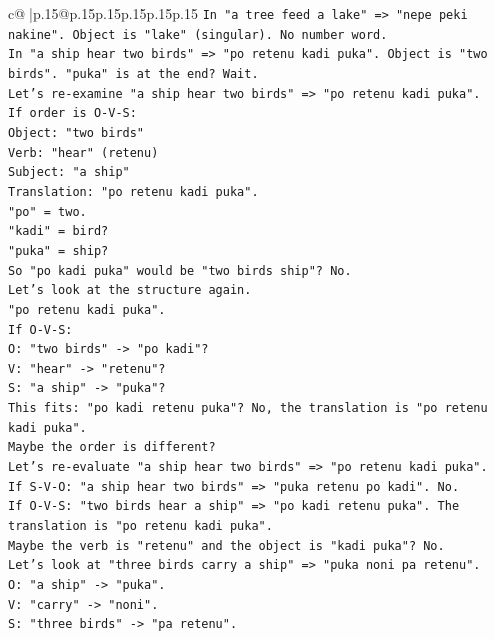 \documentclass{article}
\begin{document}
{\begin{supertabular}{c@{$\;$}|p{.15\linewidth}@{}p{.15\linewidth}p{.15\linewidth}p{.15\linewidth}p{.15\linewidth}p{.15\linewidth}}
{{{\texttt{In "a tree feed a lake" => "nepe peki nakine". Object is "lake" (singular). No number word.} \\
\texttt{In "a ship hear two birds" => "po retenu kadi puka". Object is "two birds". "puka" is at the end? Wait.} \\
\texttt{Let's re{-}examine "a ship hear two birds" => "po retenu kadi puka".} \\
\texttt{If order is O{-}V{-}S:} \\
\texttt{Object: "two birds"} \\
\texttt{Verb: "hear" (retenu)} \\
\texttt{Subject: "a ship"} \\
\texttt{Translation: "po retenu kadi puka".} \\
\texttt{"po" = two.} \\
\texttt{"kadi" = bird?} \\
\texttt{"puka" = ship?} \\
\texttt{So "po kadi puka" would be "two birds ship"? No.} \\
\texttt{Let's look at the structure again.} \\
\texttt{"po retenu kadi puka".} \\
\texttt{If O{-}V{-}S:} \\
\texttt{O: "two birds" {-}> "po kadi"?} \\
\texttt{V: "hear" {-}> "retenu"?} \\
\texttt{S: "a ship" {-}> "puka"?} \\
\texttt{This fits: "po kadi retenu puka"? No, the translation is "po retenu kadi puka".} \\
\texttt{Maybe the order is different?} \\
\texttt{Let's re{-}evaluate "a ship hear two birds" => "po retenu kadi puka".} \\
\texttt{If S{-}V{-}O: "a ship hear two birds" => "puka retenu po kadi". No.} \\
\texttt{If O{-}V{-}S: "two birds hear a ship" => "po kadi retenu puka". The translation is "po retenu kadi puka".} \\
\texttt{Maybe the verb is "retenu" and the object is "kadi puka"? No.} \\
\texttt{Let's look at "three birds carry a ship" => "puka noni pa retenu".} \\
\texttt{O: "a ship" {-}> "puka".} \\
\texttt{V: "carry" {-}> "noni".} \\
\texttt{S: "three birds" {-}> "pa retenu".} \\
}}}
\end{supertabular}}
\end{document}
